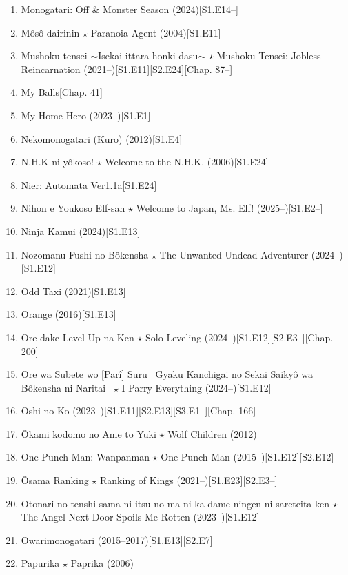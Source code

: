 \documentclass{article}
\begin{document}
\begin{enumerate}
    \item Monogatari: Off \& Monster Season (2024)\hfill[S1.E14--]
    \item {\sc Môsô dairinin $\star$ Paranoia Agent} (2004)\hfill[S1.E11]
    \item Mushoku-tensei $\sim$Isekai ittara honki dasu$\sim$ $\star$ Mushoku Tensei: Jobless Reincarnation (2021--)\hfill[S1.E11][S2.E24][Chap. 87--]
    \item My Balls\hfill[Chap. 41]
    \item My Home Hero (2023--)\hfill[S1.E1]
    \item {\sc Nekomonogatari (Kuro)} (2012)[S1.E4]
    \item {\sc N.H.K ni yôkoso! $\star$ Welcome to the N.H.K.} (2006)\hfill[S1.E24]
    \item {\sc Nier: Automata Ver1.1a}\hfill[S1.E24]
    \item Nihon e Youkoso Elf-san $\star$ Welcome to Japan, Ms. Elf! (2025--)\hfill[S1.E2--]
    \item {\sc Ninja Kamui} (2024)\hfill[S1.E13]
    \item {\sc Nozomanu Fushi no Bôkensha $\star$ The Unwanted Undead Adventurer} (2024--)\hfill[S1.E12]
    \item {\sc Odd Taxi} (2021)\hfill[S1.E13]
    \item {\sc Orange} (2016)\hfill[S1.E13]
    \item {\sc Ore dake Level Up na Ken $\star$ Solo Leveling} (2024--)\hfill[S1.E12][S2.E3--][Chap. 200]
    \item {\sc Ore wa Subete wo [Parî] Suru ~Gyaku Kanchigai no Sekai Saikyô wa Bôkensha ni Naritai~ $\star$ I Parry Everything} (2024--)\hfill[S1.E12]
    \item {\sc Oshi no Ko} (2023--)\hfill[S1.E11][S2.E13][S3.E1--][Chap. 166]
    \item {\sc \^Okami kodomo no Ame to Yuki $\star$ Wolf Children} (2012)
    \item One Punch Man: Wanpanman $\star$ One Punch Man (2015--)\hfill[S1.E12][S2.E12]
    \item \^Osama Ranking $\star$ Ranking of Kings (2021--)\hfill[S1.E23][S2.E3--]
    \item Otonari no tenshi-sama ni itsu no ma ni ka dame-ningen ni sareteita ken $\star$ The Angel Next Door Spoils Me Rotten (2023--)\hfill[S1.E12]
    \item {\sc Owarimonogatari} (2015--2017)\hfill[S1.E13][S2.E7]
    \item {\sc Papurika $\star$ Paprika} (2006)

\end{enumerate}
\end{document}
